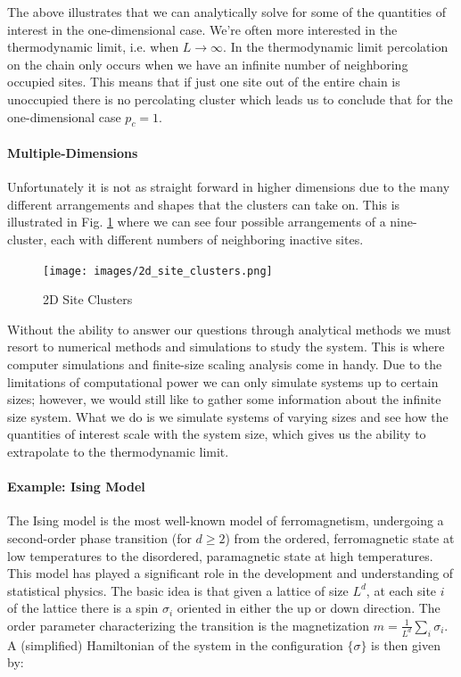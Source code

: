 The above illustrates that we can analytically solve for some of the quantities of interest in the one-dimensional case.
We're often more interested in the thermodynamic limit, i.e. when $L \rightarrow \infty$.
In the thermodynamic limit percolation on the chain only occurs when we have an infinite number of neighboring occupied sites.
This means that if just one site out of the entire chain is unoccupied there is no percolating cluster which leads us to conclude that for the one-dimensional case $p_c = 1$.

\paragraph{Multiple-Dimensions}
Unfortunately it is not as straight forward in higher dimensions due to the many different arrangements and shapes that the clusters can take on.
This is illustrated in Fig. \ref{fig:2d_site_clusters} where we can see four possible arrangements of a nine-cluster, each with different numbers of neighboring inactive sites.

\begin{figure}
	\centering
	\texttt{[image: images/2d\_site\_clusters.png]}
	\caption{2D Site Clusters}
	\label{fig:2d_site_clusters}
\end{figure}
Without the ability to answer our questions through analytical methods we must resort to numerical methods and simulations to study the system.
This is where computer simulations and finite-size scaling analysis come in handy.
Due to the limitations of computational power we can only simulate systems up to certain sizes; however, we would still like to gather some information about the infinite size system.
What we do is we simulate systems of varying sizes and see how the quantities of interest scale with the system size, which gives us the ability to extrapolate to the thermodynamic limit.

\paragraph{Example: Ising Model}
The Ising model is the most well-known model of ferromagnetism, undergoing a second-order phase transition (for $d \ge 2$) from the ordered, ferromagnetic state at low temperatures to the disordered, paramagnetic state at high temperatures.
This model has played a significant role in the development and understanding of statistical physics.
The basic idea is that given a lattice of size $L^d$, at each site $i$ of the lattice there is a spin $\sigma_i$ oriented in either the up or down direction.
The order parameter characterizing the transition is the magnetization $m = \frac{1}{L^d} \sum_i \sigma_i$.
A (simplified) Hamiltonian of the system in the configuration $\{\sigma\}$ is then given by:

